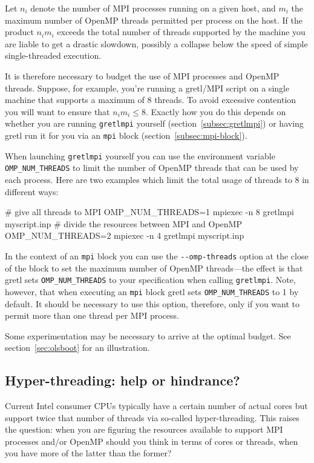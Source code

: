 \documentclass{article}
\begin{document}
Let $n_i$ denote the number of MPI processes running on a given host,
and $m_i$ the maximum number of \textsf{OpenMP} threads permitted per
process on the host. If the product $n_im_i$ exceeds the total number
of threads supported by the machine you are liable to get a drastic
slowdown, possibly a collapse below the speed of simple
single-threaded execution.

It is therefore necessary to budget the use of MPI processes and
\textsf{OpenMP} threads. Suppose, for example, you're running a
gretl/MPI script on a single machine that supports a maximum of 8
threads. To avoid excessive contention you will want to ensure that
$n_im_i \leq 8$. Exactly how you do this depends on whether you are
running \texttt{gretlmpi} yourself
(section~\ref{subsec:gretlmpi}) or having gretl run it for you via
an \texttt{mpi} block (section~\ref{subsec:mpi-block}).

When launching \texttt{gretlmpi} yourself you can use the
environment variable \verb|OMP_NUM_THREADS| to limit the number of
\textsf{OpenMP} threads that can be used by each process. Here are two
examples which limit the total usage of threads to 8 in different
ways:
\begin{code}
# give all threads to MPI
OMP_NUM_THREADS=1 mpiexec -n 8 gretlmpi myscript.inp
# divide the resources between MPI and OpenMP
OMP_NUM_THREADS=2 mpiexec -n 4 gretlmpi myscript.inp
\end{code}

In the context of an \texttt{mpi} block you can use the
\verb|--omp-threads| option at the close of the block to set the
maximum number of \textsf{OpenMP} threads---the effect is that gretl
sets \verb|OMP_NUM_THREADS| to your specification when calling
\texttt{gretlmpi}. Note, however, that when executing an
\texttt{mpi} block gretl sets \verb|OMP_NUM_THREADS| to 1 by
default. It should be necessary to use this option, therefore, only if
you want to permit more than one thread per MPI process.

Some experimentation may be necessary to arrive at the optimal budget.
See section~\ref{sec:olsboot} for an illustration.

\subsection{Hyper-threading: help or hindrance?}
\label{sec:hyper}

Current Intel consumer CPUs typically have a certain number of actual
cores but support twice that number of threads via so-called
hyper-threading. This raises the question: when you are figuring the
resources available to support MPI processes and/or \textsf{OpenMP}
should you think in terms of cores or threads, when you have more of
the latter than the former?
\end{document}
